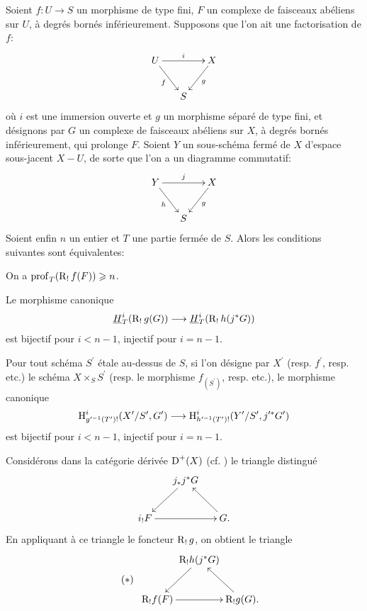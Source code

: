 \begin{proposition} \label{XIV.4.1} Soient $f\colon U\to S$ un morphisme de type fini, $F$ un complexe de faisceaux ab\'eliens sur $U$, \`a degr\'es born\'es inf\'erieurement. Supposons que l'on ait une factorisation de $f$:
$$
\xymatrix@C=15pt{ U\ar[rr]^-{i}\ar[rd]_-{f} & & X\ar[ld]^-{g}\\
& S & }$$
o\`u $i$ est une immersion ouverte et $g$ un morphisme s\'epar\'e de type fini, et d\'esignons par $G$ un complexe de faisceaux ab\'eliens sur $X$, \`a degr\'es born\'es inf\'erieurement, qui prolonge $F$. Soient $Y$ un sous-sch\'ema ferm\'e de $X$ d'espace sous-jacent $X-U$, de sorte que l'on a un diagramme commutatif:
$$
\xymatrix@C=15pt{ Y\ar[rr]^-{j}\ar[rd]_-{h} & & X\ar[ld]^-{g}\\
& S & }$$
Soient enfin $n$ un entier et $T$ une partie ferm\'ee de $S$. Alors les conditions suivantes sont \'equivalentes:
\begin{enumeratei}
\item
On a $\operatorname{prof}_{T}(\operatorname{R}_{!}f(F))\geqslant n$.
\item
Le morphisme canonique
$$
\underline{H}_{T}^{i}(\R_{!}g(G))\to\underline{H}_{T}^{i}(\R_{!}h(j^{\ast}G))$$
est bijectif pour $i<n-1$, injectif pour $i=n-1$.
\item
Pour tout sch\'ema $S^{\prime}$ \'etale au-dessus de $S$, si l'on d\'esigne par $X^{\prime}$ (resp. $f^{\prime}$, resp. etc.) le sch\'ema $X\times_{S}S^{\prime}$ (resp. le morphisme $f_{(S^{\prime})}$, resp. etc.), le morphisme canonique
$$
\H_{g^{\prime -1}(T^{\prime})!}^{i}(X^{\prime}/S^{\prime}, G^{\prime})\to\H_{h^{\prime -1}(T^{\prime})!}^{i}(Y^{\prime}/S^{\prime}, j^{\prime\ast}G^{\prime})$$
est bijectif pour $i<n-1$, injectif pour $i=n-1$.
\end{enumeratei}
\end{proposition}

Consid\'erons dans la cat\'egorie d\'eriv\'ee $\operatorname{D}^{+}(X)$ (cf. \cite{XIV.3}) le triangle distingu\'e
$$
\xymatrix@C=15pt{ & j_{\ast}j^{\ast}G\ar[ld] & \\
i_{!}F\ar[rr] & & G.\ar[lu]}$$
En appliquant \`a ce triangle le foncteur $\operatorname{R}_{!}g$, on obtient le triangle
\begin{equation*} \label{eq:XIV.4.1.*} \tag{$*$}
\begin{array}{c}
\xymatrix@C=0pt{
& \mathrm{R}_{!}h(j^{\ast}G)\ar[ld] & \\
\mathrm{R}_{!}f(F)\ar[rr] & & \mathrm{R}_{!}g(G).\ar[lu]
}
\end{array}
\end{equation*}

